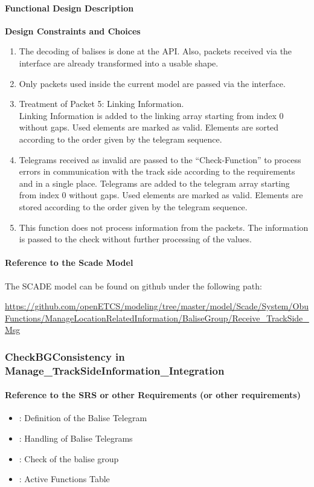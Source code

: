 \paragraph{Functional Design Description}
\textbf{Design Constraints and Choices}
\begin{enumerate}
\item The decoding of balises is done at the API. Also, packets received via the interface are already transformed into a usable shape.
\item Only packets used inside the current model are passed via the interface.\\
\item Treatment of Packet 5: Linking Information.\\
Linking Information is added to the linking array starting from index 0 without gaps. Used elements are marked as valid. Elements are sorted according to the order given by the telegram sequence.
\item Telegrams received as invalid are passed to the ``Check-Function'' to process errors in communication with the track side according to the requirements and in a single place.
Telegrams are added to the telegram array starting from index 0 without gaps. Used elements are marked as valid. Elements are stored according to the order given by the telegram sequence.
\item This function does not process information from the packets. The information is passed to the check without further processing of the values. 
\end{enumerate}
\paragraph{Reference to the Scade Model}
The SCADE model can be found on github under the following path:

\tiny\url{https://github.com/openETCS/modeling/tree/master/model/Scade/System/ObuFunctions/ManageLocationRelatedInformation/BaliseGroup/Receive_TrackSide_Msg}
\normalsize
\subsubsection{CheckBGConsistency in Manage\_TrackSideInformation\_Integration}%
\paragraph{Reference to the SRS or other Requirements (or other requirements)}
\begin{itemize}
  \item \cite[Chapt.~7 and 8]{subset-026}: Definition of the Balise Telegram
  \item \cite[Chapt.~3.4.1 - 3.4.3, 3.16.2]{subset-026}: Handling of Balise Telegrams
  \item \cite[Chapt.~3.16.2]{subset-026}: Check of the balise group
  \item \cite[Chapt.~4.5.2]{subset-026}: Active Functions Table
\end{itemize}
